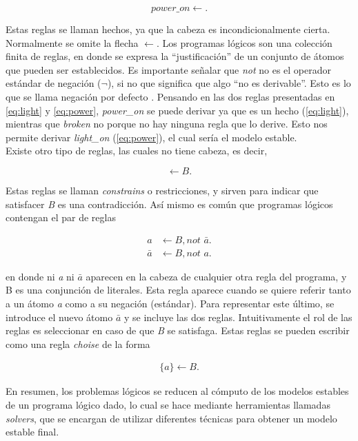 \begin{equation}\label{eq:power}
	\textit{power\_on} \leftarrow.
\end{equation}

Estas reglas se llaman hechos, ya que la cabeza es incondicionalmente cierta. Normalmente se omite la flecha $\leftarrow$. Los programas lógicos son una colección finita de reglas, en donde se expresa la ``justificación'' de un conjunto de átomos que pueden ser establecidos. Es importante señalar que \textit{not} no es el operador estándar de negación ($\lnot$), si no que significa que algo ``no es derivable''. Esto es lo que se llama negación por defecto \cite{negation}. Pensando en las dos reglas presentadas en \ref{eq:light} y \ref{eq:power}, \textit{power\_on} se puede derivar ya que es un hecho (\ref{eq:light}), mientras que \textit{broken} no porque no hay ninguna regla que lo derive. Esto nos permite derivar \textit{light\_on} (\ref{eq:power}), el cual sería el modelo estable. \\

Existe otro tipo de reglas, las cuales no tiene cabeza, es decir,

\begin{equation}
	\leftarrow B.
\end{equation}

Estas reglas se llaman \textit{constrains} o restricciones, y sirven para indicar que satisfacer \textit{B} es una contradicción. Así mismo es común que programas lógicos contengan el par de reglas

\begin{align}
	a &\leftarrow B, \textit{not } \bar{a}.\\
	\bar{a} &\leftarrow B, \textit{not } a.
\end{align}

en donde ni \textit{a} ni $\bar{a}$ aparecen en la cabeza de cualquier otra regla del programa, y B es una conjunción de literales. Esta regla aparece cuando se quiere referir tanto a un átomo \textit{a} como a su negación (estándar). Para representar este último, se introduce el nuevo átomo $\bar{a}$ y se incluye las dos reglas. Intuitivamente el rol de las reglas es seleccionar en caso de que \textit{B} se satisfaga. Estas reglas se pueden escribir como una regla \textit{choise} de la forma

\begin{align}
	\{a\} \leftarrow B.
\end{align}

En resumen, los problemas lógicos se reducen al cómputo de los modelos estables de un programa lógico dado, lo cual se hace mediante herramientas llamadas \textit{solvers}, que se encargan de utilizar diferentes técnicas para obtener un modelo estable final. \\

